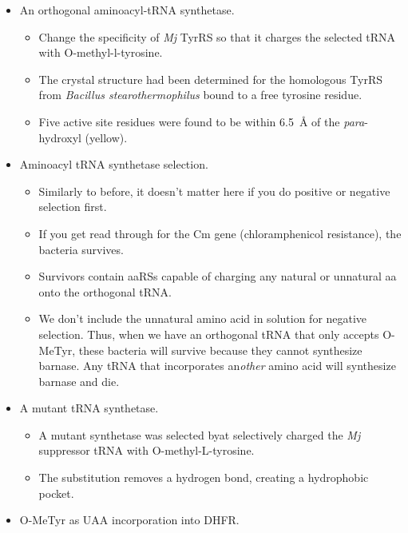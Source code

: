 \documentclass[../notes.tex]{subfiles}
\begin{document}
\begin{itemize}
\begin{itemize}
        \item You now have a tRNA that can only be charged by exogenous amino acid residues.
        \item Orthogonal tRNA and the right gene gives you great ampicillin resistance
    \end{itemize}
    \item An orthogonal aminoacyl-tRNA synthetase.
    \begin{itemize}
        \item Change the specificity of \emph{Mj} TyrRS so that it charges the selected tRNA with O-methyl-l-tyrosine.
        \item The crystal structure had been determined for the homologous TyrRS from \emph{Bacillus stearothermophilus} bound to a free tyrosine residue.
        \item Five active site residues were found to be within \SI{6.5}{\angstrom} of the \emph{para}-hydroxyl (yellow).
    \end{itemize}
    \item Aminoacyl tRNA synthetase selection.
    \begin{itemize}
        \item Similarly to before, it doesn't matter here if you do positive or negative selection first.
        \item If you get read through for the Cm gene (chloramphenicol resistance), the bacteria survives.
        \item Survivors contain aaRSs capable of charging any natural or unnatural aa onto the orthogonal tRNA.
        \item We don't include the unnatural amino acid in solution for negative selection. Thus, when we have an orthogonal tRNA that only accepts O-MeTyr, these bacteria will survive because they cannot synthesize barnase. Any tRNA that incorporates an\emph{other} amino acid will synthesize barnase and die.
    \end{itemize}
    \item A mutant tRNA synthetase.
    \begin{itemize}
        \item A mutant synthetase was selected byat selectively charged the \emph{Mj} suppressor tRNA with O-methyl-L-tyrosine.
        \item The substitution removes a hydrogen bond, creating a hydrophobic pocket.
    \end{itemize}
    \item O-MeTyr as UAA incorporation into DHFR.

\end{itemize}
\end{document}
